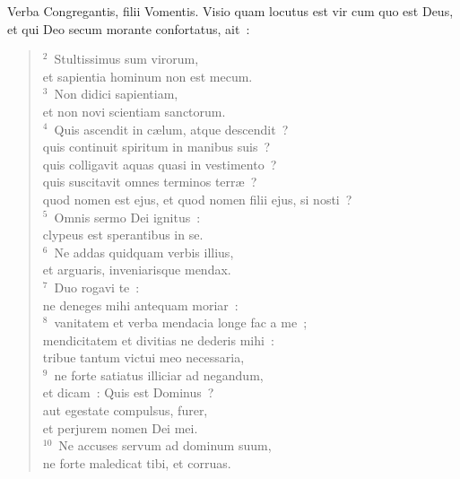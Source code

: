 \lettrine[lines=3,image=true,loversize=0.05,lraise=-0.03]{V}{}erba Congregantis, filii Vomentis. Visio quam locutus est vir cum quo est Deus, et qui Deo secum morante confortatus, ait~:
\begin{flushleft}\begin{verse}\vspace{6pt}${}^{2}$~Stultissimus sum virorum,\\ et sapientia hominum non est mecum.\\
${}^{3}$~Non didici sapientiam,\\ et non novi scientiam sanctorum.\\
${}^{4}$~Quis ascendit in c\ae lum, atque descendit~?\\ quis continuit spiritum in manibus suis~?\\ quis colligavit aquas quasi in vestimento~?\\ quis suscitavit omnes terminos terr\ae~?\\ quod nomen est ejus, et quod nomen filii ejus, si nosti~?\\
${}^{5}$~Omnis sermo Dei ignitus~:\\ clypeus est sperantibus in se.\\
${}^{6}$~Ne addas quidquam verbis illius,\\ et arguaris, inveniarisque mendax.\\
${}^{7}$~Duo rogavi te~:\\ ne deneges mihi antequam moriar~:\\
${}^{8}$~vanitatem et verba mendacia longe fac a me~;\\ mendicitatem et divitias ne dederis mihi~:\\ tribue tantum victui meo necessaria,\\
${}^{9}$~ne forte satiatus illiciar ad negandum,\\ et dicam~: Quis est Dominus~?\\ aut egestate compulsus, furer,\\ et perjurem nomen Dei mei.\\
${}^{10}$~Ne accuses servum ad dominum suum,\\ ne forte maledicat tibi, et corruas.\end{verse}\end{flushleft}


